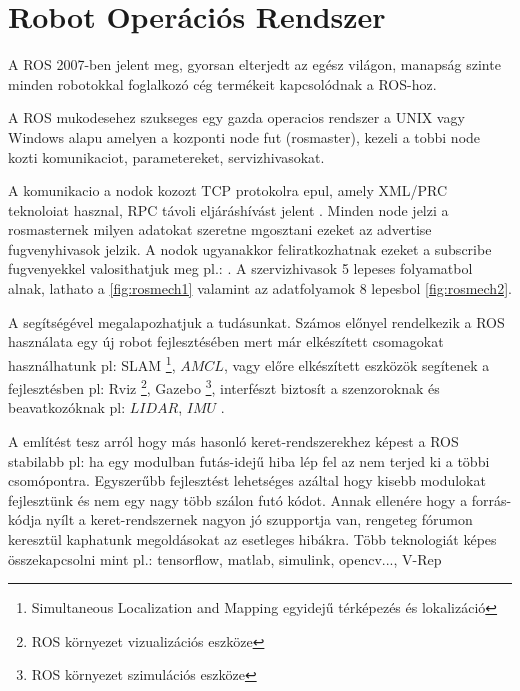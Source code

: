 

\section{Robot Operációs Rendszer} 
A ROS 2007-ben jelent meg, gyorsan elterjedt az egész világon, manapság szinte minden robotokkal foglalkozó cég termékeit kapcsolódnak a ROS-hoz.

A ROS mukodesehez szukseges egy gazda operacios rendszer a UNIX vagy Windows alapu amelyen a kozponti node fut (rosmaster), kezeli a tobbi node kozti komunikaciot, parametereket, servizhivasokat.

A komunikacio a nodok kozozt TCP protokolra epul, amely XML/PRC teknoloiat hasznal, RPC távoli eljáráshívást jelent \cite{xmlrpc}.
Minden node jelzi a rosmasternek milyen adatokat szeretne mgosztani ezeket az advertise fugvenyhivasok jelzik. A nodok ugyanakkor feliratkozhatnak ezeket a subscribe fugvenyekkel valosithatjuk meg pl.: \cite{rossubpubexample}.
A szervizhivasok 5 lepeses folyamatbol alnak, lathato a \ref{fig:rosmech1} valamint az adatfolyamok 8 lepesbol \ref{fig:rosmech2}.



\renewcommand{\img}{AktualisTudomany/rosmech1.jpg}
\renewcommand{\sources}{Forrás: http://answers.ros.org}
\renewcommand{\captionn}{ROS kommunicacios mechanizmus szervizhivasokra}
\renewcommand{\aspectratioPic}{0.7}
\renewcommand{\figlabel}{rosmech1}



\renewcommand{\img}{AktualisTudomany/rosmech2.jpg}
\renewcommand{\sources}{Forrás: http://answers.ros.org}
\renewcommand{\captionn}{ROS kommunicacios mechanizmus adatfolyamokra}
\renewcommand{\aspectratioPic}{0.7}
\renewcommand{\figlabel}{rosmech2}


A \cite{lentin2015} \cite{NagyPirosKonyv} segítségével megalapozhatjuk a tudásunkat. Számos előnyel rendelkezik a ROS használata egy új robot fejlesztésében mert már elkészített csomagokat használhatunk pl: SLAM \footnote{ Simultaneous Localization and Mapping egyidejű térképezés és lokalizáció}, $AMCL$, vagy előre elkészített eszközök segítenek a fejlesztésben pl: Rviz  \footnote{ROS környezet vizualizációs eszköze}, Gazebo \footnote{ROS környezet szimulációs eszköze}, interfészt biztosít a szenzoroknak és beavatkozóknak pl: $LIDAR$, $IMU$ .

A \cite{lentin2015} említést tesz arról hogy más hasonló keret-rendszerekhez képest a ROS stabilabb pl: ha egy modulban futás-idejű hiba lép fel az nem terjed ki a többi csomópontra.
Egyszerűbb fejlesztést lehetséges azáltal hogy kisebb modulokat fejlesztünk és nem egy nagy több szálon futó kódot. Annak ellenére hogy a forrás-kódja nyílt a keret-rendszernek nagyon jó szupportja van, rengeteg fórumon keresztül kaphatunk megoldásokat az esetleges hibákra. Több teknologiát képes összekapcsolni mint pl.: tensorflow, matlab, simulink, opencv..., V-Rep

